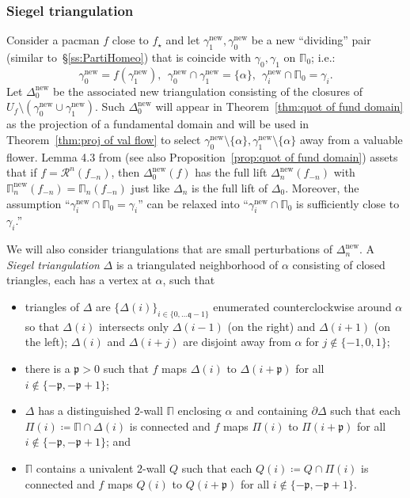 \documentclass{amsart}
\renewcommand{\sp}{{\ \ }}
\newcommand{\1}{{\mathbb 1 }}
\newcommand{\bDelta}{{\mathbb{\Delta}}}
\newcommand{\bPi}{{\mathbb{\Pi}}}
\newcommand\RR{\mathcal{R}}
\newcommand{\str}{{\star}}
\newcommand{\pp}{\mathfrak{p}}
\renewcommand{\qq}{\mathfrak{q}}
\newcommand\wall{{Q}}
\newcommand\new{{\operatorname{new}}}
\theoremstyle{remark}
\numberwithin{equation}{section}
\theoremstyle{definition}
\theoremstyle{nonumberbreak}
\begin{document}
\subsubsection{Siegel triangulation}
\label{sss:SiegTriang} Consider a pacman $f$ close to $f_\str$ and let $\gamma_1^\new, \gamma^\new_0$ be a new ``dividing'' pair (similar to~\S\ref{ss:PartiHomeo}) that is coincide with $\gamma_0,\gamma_1$ on $\bPi_0$; i.e.:
\[\gamma^\new_0=f(\gamma^\new_1), \sp \gamma_0^\new\cap  \gamma_1^\new=\{\alpha\},\sp \gamma_i^\new\cap \bPi_0=\gamma_i.\]
Let $\bDelta^\new_0$ be the associated new triangulation consisting of the closures of $U_{f}\setminus {(\gamma_0^\new\cup \gamma_1^\new)}$. Such $\bDelta^\new_0$ will appear in Theorem~\ref{thm:quot of fund domain} as the projection of a fundamental domain and will be used in Theorem~\ref{thm:proj of val flow} to select $\gamma_0^\new\setminus \{\alpha\} , \gamma^\new _1\setminus \{\alpha\}$ away from a valuable flower. Lemma 4.3 from \cite{DLS} (see also Proposition~\ref{prop:quot of fund domain}) assets that if $f=\RR^n(f_{-n})$, then $\bDelta^\new_0(f)$ has the full lift $\bDelta_n^\new(f_{-n})$ with $\bPi_n^\new(f_{-n})=\bPi_n(f_{-n})$ just like $\bDelta_n$ is the full lift of $\bDelta_0$. Moreover, the assumption ``$\gamma_i^\new\cap \bPi_0=\gamma_i$'' can be relaxed into ``$\gamma_i^\new\cap \bPi_0$ is sufficiently close to $\gamma_i$.''






We will also consider triangulations that are small perturbations of $\bDelta^\new_n$. A \emph{Siegel triangulation} $\bDelta$ is a triangulated neighborhood of $\alpha$ consisting of closed triangles, each has a vertex at $\alpha$, such that
\begin{itemize}
\item triangles of $\bDelta$ are $\{\Delta(i)\}_{i\in \{0,\dots \qq-1\}}$ enumerated counterclockwise around $\alpha$ so that $\Delta(i)$ intersects only $\Delta(i-1)$ (on the right) and $\Delta(i+1)$ (on the left); $\Delta(i)$ and $\Delta(i+j)$ are disjoint away from $\alpha$ for $j\not\in \{-1,0,1\}$;
\item there is a $\pp>0$ such that $f$ maps $\Delta(i)$ to $\Delta(i+\pp)$ for all $i\not\in \{-\pp, -\pp+1\}$;
\item $\bDelta$ has a distinguished $2$-wall $\bPi$ enclosing $\alpha$ and containing $\partial \bDelta$ such that each $\Pi(i)\coloneqq \bPi\cap \Delta(i)$ is connected and $f$ maps $\Pi(i)$ to $\Pi(i+\pp)$ for all $i\not\in \{-\pp, -\pp+1\}$; and 
\item  $\bPi$ contains a univalent $2$-wall $\wall$ such that each $\wall(i)\coloneqq \wall\cap \Pi(i)$ is connected and $f$ maps $\wall(i)$ to $\wall(i+\pp)$ for all $i\not\in \{-\pp, -\pp+1\}$.
 \end{itemize}
\end{document}
